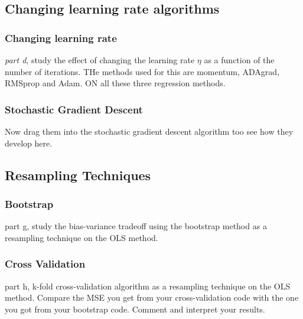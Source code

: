 \documentclass[amssymb,twocolumn,aps]{revtex4}
\begin{document}
\subsection{Changing learning rate algorithms}

\subsubsection{Changing learning rate}
\textit{part d}, study the effect of changing the learning rate $\eta$ as a function of the number of iterations. THe methods used for this are momentum, ADAgrad, RMSprop and Adam.
ON all these three regression methods.

\subsubsection{Stochastic Gradient Descent}
Now drag them into the stochastic gradient descent algorithm too see how they develop here.


\subsection{Resampling Techniques}

\subsubsection{Bootstrap}
part g, study the bias-variance tradeoff using the bootstrap method as a resampling technique on the OLS method.

\subsubsection{Cross Validation}
part h, k-fold cross-validation algorithm as a resampling technique on the OLS method. Compare the MSE you get from your cross-validation code with the one you got from your bootstrap code.
Comment and interpret your results.
\end{document}

